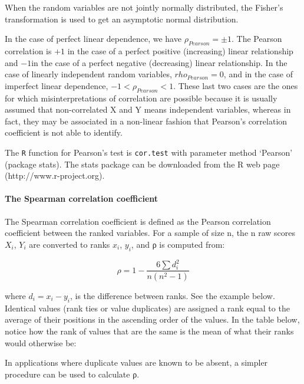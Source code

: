 \documentclass[a4paper]{article}
\begin{document}
When the random variables are not jointly normally distributed, the Fisher's transformation is used to get an asymptotic normal distribution.

In the case of perfect linear dependence, we have $\rho_{Pearson} = \pm1$. The Pearson correlation is $+1$ in the case of a perfect positive (increasing) linear relationship and $-1 $in the case of a perfect negative (decreasing) linear relationship. In the case of linearly independent random variables, $rho_{Pearson} = 0$, and in the case of imperfect linear dependence, $-1 < \rho_{Pearson} < 1$. These last two cases are the ones for which misinterpretations of correlation are possible because it is usually assumed that non-correlated X and Y means independent variables, whereas in fact, they may be associated in a non-linear fashion that Pearson's correlation coefficient is not able to identify.

The \texttt{R} function for Pearson's test is \texttt{cor.test} with parameter method `Pearson' (package stats). The stats package can be downloaded from the R web page (http://www.r-project.org).

\paragraph{The Spearman correlation coefficient}

The Spearman correlation coefficient is defined as the Pearson correlation coefficient between the ranked variables. For a sample of size n, the n raw scores $X_i$, $Y_i$ are converted to ranks $x_i$, $y_i$, and ρ is computed from:

\begin{equation}
\rho = {1- \frac {6 \sum d_i^2}{n(n^2 - 1)}}
\end{equation}

where $d_{i} = x_{i} - y_{i}$, is the difference between ranks. See the example below. Identical values (rank ties or value duplicates) are assigned a rank equal to the average of their positions in the ascending order of the values. In the table below, notice how the rank of values that are the same is the mean of what their ranks would otherwise be:

In applications where duplicate values are known to be absent, a simpler procedure can be used to calculate ρ.
\end{document}
